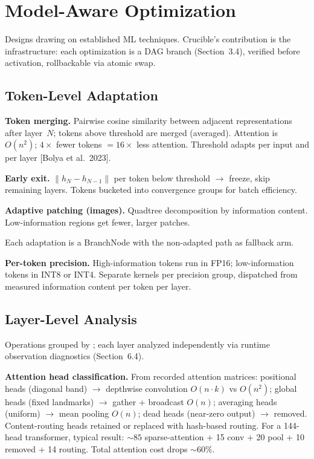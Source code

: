 
\section{Model-Aware Optimization}\label{sec:optimization}

Designs drawing on established ML techniques.
Crucible's contribution is the infrastructure: each optimization is a DAG branch (Section~3.4), verified before activation, rollbackable via atomic swap.

\subsection{Token-Level Adaptation}

\textbf{Token merging.}
Pairwise cosine similarity between adjacent representations after layer~$N$; tokens above threshold are merged (averaged).
Attention is $O(n^2)$; $4\times$ fewer tokens $= 16\times$ less attention.
Threshold adapts per input and per layer [Bolya et al.\ 2023].

\textbf{Early exit.}
$\|h_N - h_{N-1}\|$ per token below threshold $\to$ freeze, skip remaining layers.
Tokens bucketed into convergence groups for batch efficiency.

\textbf{Adaptive patching (images).}
Quadtree decomposition by information content.
Low-information regions get fewer, larger patches.

Each adaptation is a BranchNode with the non-adapted path as fallback arm.

\textbf{Per-token precision.}
High-information tokens run in FP16; low-information tokens in INT8 or INT4.
Separate kernels per precision group, dispatched from measured information content per token per layer.

\subsection{Layer-Level Analysis}

Operations grouped by ; each layer analyzed independently via runtime observation diagnostics (Section~6.4).

\textbf{Attention head classification.}
From recorded attention matrices: positional heads (diagonal band) $\to$ depthwise convolution $O(n \cdot k)$ vs $O(n^2)$; global heads (fixed landmarks) $\to$ gather + broadcast $O(n)$; averaging heads (uniform) $\to$ mean pooling $O(n)$; dead heads (near-zero output) $\to$ removed.
Content-routing heads retained or replaced with hash-based routing.
For a 144-head transformer, typical result: ${\sim}85$ sparse-attention + 15 conv + 20 pool + 10 removed + 14 routing.
Total attention cost drops ${\sim}60\%$.

